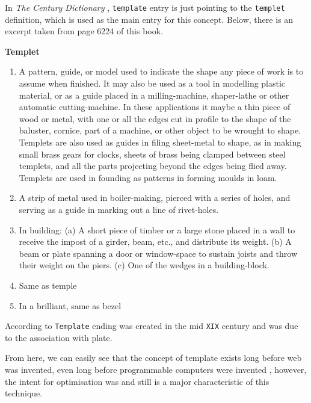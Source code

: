In \textit{The Century Dictionary} \cite[p.6224]{Whitney1906TheDictionary}, \texttt{template} entry is just pointing to the \texttt{templet} definition, which is used as the main entry for this concept. Below, there is an excerpt taken from page 6224 of this book.

\begin{bookQuote}
     \textbf{Templet} 
     
     \begin{enumerate}
         \item A pattern, guide, or model used to indicate the shape any piece of work is to assume when finished. It may also be used as a tool in modelling plastic material, or as a guide placed in a milling-machine, shaper-lathe or other automatic cutting-machine. In these applications it maybe a thin piece of wood or metal, with one or all the edges cut in profile to the shape of the baluster, cornice, part of a machine, or other object to be wrought to shape. Templets are also used as guides in filing sheet-metal to shape, as in making small brass gears for clocks, sheets of brass being clamped between steel templets, and all the parts projecting beyond the edges being flied away. Templets are used in founding as patterns in forming moulds in loam.
         
         \item A strip of metal used in boiler-making, pierced with a series of holes, and serving as a guide in marking out a line of rivet-holes.
         \item In building: (a) A short piece of timber or a large stone placed in a wall to receive the impost of a girder, beam, etc., and distribute its weight. (b) A beam or plate spanning a door or window-space to sustain joists and throw their weight on the piers. (c) One of the wedges in a building-block.
         \item Same as temple
         \item In a brilliant, same as bezel
     \end{enumerate}
\end{bookQuote}

According to \cite{Barnhart1988TheEtymology} \texttt{Template} ending was created in the mid \texttt{XIX} century and was due to the association with plate. 

From here, we can easily see that the concept of template exists long before web was invented, even long before programmable computers were invented \cite{Clements2014ComputerVariations}, however, the intent for optimisation was and still is a major characteristic of this technique.

